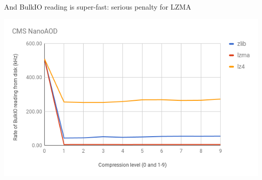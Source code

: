 \documentclass[aspectratio=169]{beamer}
\begin{document}
\begin{frame}{And BulkIO reading is super-fast: serious penalty for LZMA}
\vspace{0.1 cm}
\begin{center}
\includegraphics[width=0.9\linewidth]{bulk-vs-compression.png}
\end{center}
\end{frame}
\end{document}
